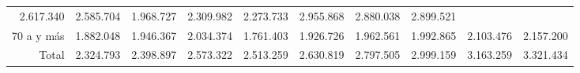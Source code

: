 \begin{tabular}{llllllllll}
  \multicolumn{1}{r}{2.617.340} &
  \multicolumn{1}{r}{2.585.704} &
  \multicolumn{1}{r}{1.968.727} &
  \multicolumn{1}{r}{2.309.982} &
  \multicolumn{1}{r}{2.273.733} &
  \multicolumn{1}{r}{2.955.868} &
  \multicolumn{1}{r}{2.880.038} &
  \multicolumn{1}{r}{2.899.521} \\
\multicolumn{1}{r}{70 a y más\hspace{1em}} &
  \multicolumn{1}{|r}{1.882.048} &
  \multicolumn{1}{r}{1.946.367} &
  \multicolumn{1}{r}{2.034.374} &
  \multicolumn{1}{r}{1.761.403} &
  \multicolumn{1}{r}{1.926.726} &
  \multicolumn{1}{r}{1.962.561} &
  \multicolumn{1}{r}{1.992.865} &
  \multicolumn{1}{r}{2.103.476} &
  \multicolumn{1}{r}{2.157.200} \\
\multicolumn{1}{r}{Total\hspace{1em}} &
  \multicolumn{1}{|r}{2.324.793} &
  \multicolumn{1}{r}{2.398.897} &
  \multicolumn{1}{r}{2.573.322} &
  \multicolumn{1}{r}{2.513.259} &
  \multicolumn{1}{r}{2.630.819} &
  \multicolumn{1}{r}{2.797.505} &
  \multicolumn{1}{r}{2.999.159} &
  \multicolumn{1}{r}{3.163.259} &
  \multicolumn{1}{r}{3.321.434} \\
\cline{1-10}
\end{tabular}
